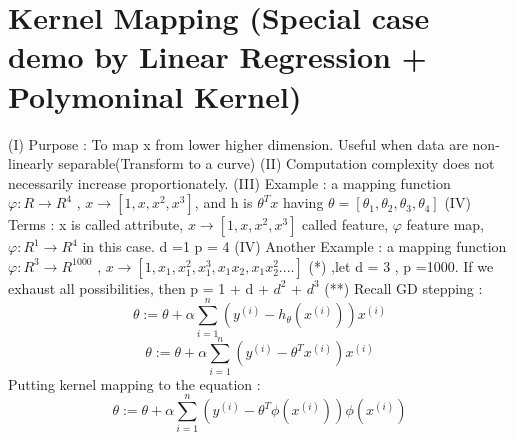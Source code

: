 \documentclass{article}
\begin{document}
\section{Kernel Mapping (Special case demo by Linear Regression + Polymoninal Kernel)}
(I) Purpose : To map x from lower higher dimension. Useful when data are non-linearly separable(Transform to a curve) 
\newline
(II) Computation complexity does not necessarily increase proportionately.
\newline
(III) Example : a mapping function \(\varphi : R \to R^{4}\) , \(x \to [1,x,x^{2},x^{3}]\), and h is \(\theta^{T}x\) having  \(\theta  = [\theta_1,\theta_2,\theta_3,\theta_4]\) 
\newline
(IV) Terms : x is called attribute, \(x \to [1,x,x^{2},x^{3}]\) called feature, \(\varphi\) feature map, \(\varphi : R^{1} \to R^{4}\) in this case. d =1 p = 4 
\newline
(IV) Another Example : a mapping function \(\varphi : R^{3} \to R^{1000}\) , \(x \to [1,x_1,x_1^{2},x_1^{3},x_1 x_2,x_1 x_2^{2} .... ]\) (*) ,let d  = 3 , p =1000. If we exhaust all possibilities, then p = 1 + d + \(d^2\) + \(d^3\)  (**) 
\newline
Recall GD stepping  : 
\[\theta := \theta + \alpha \sum_{i=1}^{n} (y^{(i)} - h_{\theta}(x^{(i)}))x^{(i)}\]
\[\theta := \theta + \alpha \sum_{i=1}^{n} (y^{(i)} - \theta^Tx^{(i)})x^{(i)}\]
Putting kernel mapping to the equation :
\[\theta := \theta + \alpha \sum_{i=1}^{n} (y^{(i)} - \theta^T\phi(x^{(i)}))\phi(x^{(i)})\]
\end{document}
